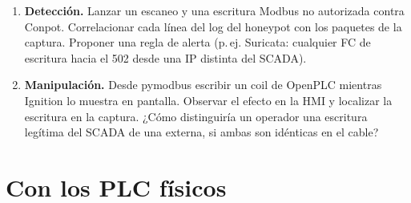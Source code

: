 \begin{enumerate}[label=\textbf{E\arabic*.},leftmargin=*,itemsep=4pt]
  \item \textbf{Detección.} Lanzar un escaneo y una escritura Modbus no autorizada contra Conpot. Correlacionar cada línea del log del honeypot con los paquetes de la captura. Proponer una regla de alerta (p.\,ej. Suricata: cualquier FC de escritura hacia el 502 desde una IP distinta del SCADA).
  \item \textbf{Manipulación.} Desde pymodbus escribir un coil de OpenPLC mientras Ignition lo muestra en pantalla. Observar el efecto en la HMI y localizar la escritura en la captura. ¿Cómo distinguiría un operador una escritura legítima del SCADA de una externa, si ambas son idénticas en el cable?
\end{enumerate}

\section{Con los PLC físicos}

